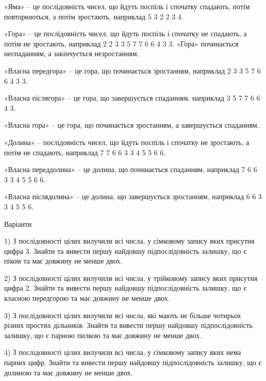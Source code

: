 \documentclass[11pt, ukrainian]{article}
\begin{document}
«Яма» – це послідовність чисел, що йдуть поспіль і спочатку спадають, потім повторюються, а потім зростають, наприклад 5 3 2 2 3 4.

«Гора» – це послідовність чисел, що йдуть поспіль і спочатку не спадають, а потім не зростають, наприклад 2 2 3 3 5 7 7 6 6 4 3 3. «Гора» починається неспаданням, а закінчується незростанням. 

«Власна передгора» – це гора, що починається зростанням, наприклад 2 3 3 5 7 6 6 4 3 3. 

«Власна післягора» – це гора, що завершується спаданням, наприклад  3 5 7 7 6 6 4 3.

«Власна гора» – це гора, що починається зростанням, а завершується спаданням.

«Долина» – послідовність чисел, що йдуть поспіль і спочатку не зростають, а потім не спадають, наприклад 7 7 6 6 3 3 4 5 5 6 6.

«Власна переддолина» – це долина, що починається спаданням, наприклад 7 6 6 3 3 4 5 5 6 6. 

«Власна післядолина» – це долина, що завершується зростанням, наприклад 6 6 3 3 4 5 5 6.

\par \bigskip
\newpage

{\center  Варіанти \par \bigskip\bigskip}

1) \space 
З послідовності цілих вилучили всі числа, у сімковому запису яких присутня цифра 3. Знайти та вивести першу найдовшу підпослідовність залишку, що є піком та має довжину не менше двох.

\par
\vspace{0.9cm}
2) \space 
З послідовності цілих вилучили всі числа, у трійковому запису яких присутня цифра 2. Знайти та вивести першу найдовшу підпослідовність залишку, що є власною передгорою та має довжину не менше двох.

\par
\vspace{0.9cm}
3) \space 
З послідовності цілих вилучили всі числа, які мають не більше чотирьох різних простих дільників. Знайти та вивести першу найдовшу підпослідовність залишку, що є парною пилкою та має довжину не менше двох.

\par
\vspace{0.9cm}
4) \space 
З послідовності цілих вилучили всі числа, у сімковому запису яких нема парних цифр. Знайти та вивести першу найдовшу підпослідовність залишку, що є долиною та має довжину не менше двох.
\end{document}
